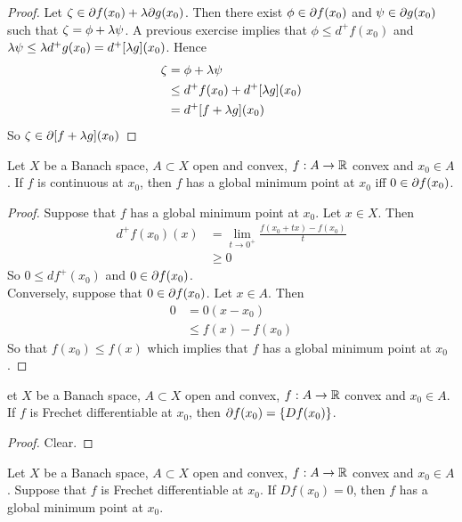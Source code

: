 \documentclass{book}
\begin{document}
	\begin{proof}
	Let $\zeta \in \partial f(x_0) + \lambda \partial g(x_0)$. Then there exist $\phi \in \partial f(x_0)$ and $\psi \in \partial g(x_0)$ such that $\zeta = \phi + \lambda \psi$. A previous exercise implies that $\phi \leq d^+f(x_0)$ and $\lambda \psi \leq \lambda d^+g(x_0) = d^+[\lambda g](x_0)$. Hence 
	\begin{align*}
	\zeta
	&= \phi + \lambda \psi \\
	&\leq d^+f(x_0) + d^+[\lambda g](x_0) \\
	&= d^+[f + \lambda g](x_0)
	\end{align*}
	So $\zeta \in \partial [f+\lambda g](x_0)$
	\end{proof}
	
	\begin{ex} \lex{}
	Let $X$ be a Banach space, $A \subset X$ open and convex, $f:A \rightarrow \mathbb{R}$ convex and $x_0 \in A$. If $f$ is continuous at $x_0$, then $f$ has a global minimum point at $x_0$ iff $0 \in \partial f(x_0)$.
	\end{ex}
	
	\begin{proof}
	Suppose that $f$ has a global minimum point at $x_0$. Let $x \in X$. Then 
	\begin{align*}
	d^+f(x_0)(x) 
	&= \lim_{t \rightarrow 0^+} \frac{f(x_0 + tx) - f(x_0)}{t} \\
	& \geq 0
	\end{align*}
	So $0 \leq df^+(x_0)$ and $0 \in \partial f(x_0)$.\\
	Conversely, suppose that $0 \in \partial f(x_0)$. Let $x \in A$. Then 
	\begin{align*}
	0
	& = 0(x - x_0) \\
	& \leq f(x) - f(x_0)
	\end{align*}
	So that $f(x_0) \leq f(x)$ which implies that $f$ has a global minimum point at $x_0$.
	\end{proof}
	
	\begin{ex}
	et $X$ be a Banach space, $A \subset X$ open and convex, $f:A \rightarrow \mathbb{R}$ convex and $x_0 \in A$. If $f$ is Frechet differentiable at $x_0$, then $\partial f(x_0) = \{Df(x_0)\}$. 
	\end{ex}	
	
	\begin{proof}
	Clear.
	\end{proof}
	
	\begin{ex}
	Let $X$ be a Banach space, $A \subset X$ open and convex, $f:A \rightarrow \mathbb{R}$ convex and $x_0 \in A$. Suppose that $f$ is Frechet differentiable at $x_0$. If $Df(x_0) = 0$, then $f$ has a global minimum point at $x_0$. 
	\end{ex}
	
\end{document}

